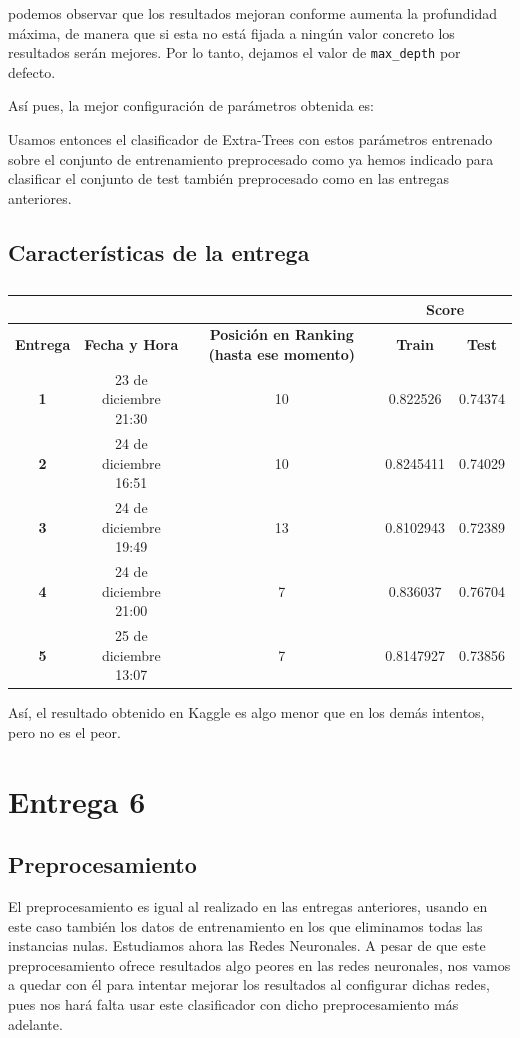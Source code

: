 \documentclass[a4paper,11pt]{article}
\begin{document}
 podemos observar que los resultados mejoran conforme aumenta la profundidad máxima, de manera que si esta no está fijada a ningún valor concreto los resultados serán mejores. Por lo tanto, dejamos el valor de \texttt{max_depth} por defecto. 
 
 Así pues, la mejor configuración de parámetros obtenida es:
 
 Usamos entonces el clasificador de Extra-Trees con estos parámetros entrenado sobre el conjunto de entrenamiento preprocesado como ya hemos indicado para clasificar el conjunto de test también preprocesado como en las entregas anteriores. 
 
 \subsection{Características de la entrega}
\begin{table}[htbp]
	\caption{}\begin{center}
	\begin{tabular}{|c|c|c|c|c|}
		\hline
		\multicolumn{1}{|l|}{\textbf{}} & \textbf{} & \textbf{} & \multicolumn{ 2}{c|}{\textbf{Score}} \\ \hline
		\textbf{Entrega} & \textbf{Fecha y Hora} & \textbf{Posición en Ranking (hasta ese momento)} & \textbf{Train} & \textbf{Test} \\ \hline
		\textbf{1} & 23 de diciembre 21:30 & 10 & 0.822526 & 0.74374 \\ \hline
		\textbf{2} &  24 de diciembre  16:51 & 10 & 0.8245411 & 0.74029 \\ \hline
		\textbf{3} & 24  de diciembre 19:49 & 13 & 0.8102943 & 0.72389 \\ \hline
		\textbf{4} & 24 de diciembre 21:00  & 7 & 0.836037 & 0.76704 \\ \hline
		\textbf{5} &  25 de diciembre 13:07 & 7 & 0.8147927 & 0.73856 \\ \hline
	\end{tabular}\end{center}
	\label{}
\end{table}
 Así, el resultado obtenido en Kaggle es algo menor que en los demás intentos, pero no es el peor. 
 
 \section{Entrega 6}
 \subsection{Preprocesamiento}
El preprocesamiento es igual al realizado en las entregas anteriores, usando en este caso también los datos de entrenamiento en los que eliminamos todas las instancias nulas. Estudiamos ahora las Redes Neuronales. A pesar de que este preprocesamiento ofrece resultados algo peores en las redes neuronales, nos vamos a quedar con él para intentar mejorar los resultados al configurar dichas redes, pues nos hará falta usar este clasificador con dicho preprocesamiento más adelante.  
\end{document}
